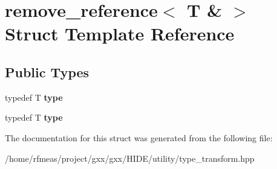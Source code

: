 \hypertarget{structremove__reference_3_01T_01_6_01_4}{}\section{remove\+\_\+reference$<$ T \& $>$ Struct Template Reference}
\label{structremove__reference_3_01T_01_6_01_4}
\subsection*{Public Types}
\begin{DoxyCompactItemize}
\item 
typedef T {\bfseries type}\hypertarget{structremove__reference_3_01T_01_6_01_4_a3f40f309be0072f0d8cfc51b7be64a9d}{}\label{structremove__reference_3_01T_01_6_01_4_a3f40f309be0072f0d8cfc51b7be64a9d}

\item 
typedef T {\bfseries type}\hypertarget{structremove__reference_3_01T_01_6_01_4_a3f40f309be0072f0d8cfc51b7be64a9d}{}\label{structremove__reference_3_01T_01_6_01_4_a3f40f309be0072f0d8cfc51b7be64a9d}

\end{DoxyCompactItemize}


The documentation for this struct was generated from the following file\+:\begin{DoxyCompactItemize}
\item 
/home/rfmeas/project/gxx/gxx/\+H\+I\+D\+E/utility/type\+\_\+transform.\+hpp\end{DoxyCompactItemize}
